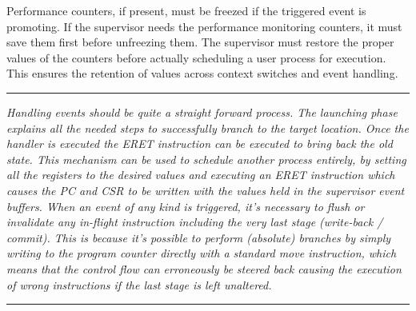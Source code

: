         \vspace{10pt}

        Performance counters, if present, must be freezed if the triggered event is promoting. If the supervisor needs the performance monitoring counters, it must save them first before unfreezing them. The supervisor must restore the proper values of the counters before actually scheduling a user process for execution. This ensures the retention of values across context switches and event handling.

    \par\noindent\rule{\textwidth}{0.4pt}
    \textit{Handling events should be quite a straight forward process. The launching phase explains all the needed steps to successfully branch to the target location. Once the handler is executed the ERET instruction can be executed to bring back the old state. This mechanism can be used to schedule another process entirely, by setting all the registers to the desired values and executing an ERET instruction which causes the PC and CSR to be written with the values held in the supervisor event buffers. When an event of any kind is triggered, it's necessary to flush or invalidate any in-flight instruction including the very last stage (write-back / commit). This is because it's possible to perform (absolute) branches by simply writing to the program counter directly with a standard move instruction, which means that the control flow can erroneously be steered back causing the execution of wrong instructions if the last stage is left unaltered.}
    \par\noindent\rule{\textwidth}{0.4pt}

    \vspace{10pt}
    
    \vspace{10pt}
    \vspace{10pt}